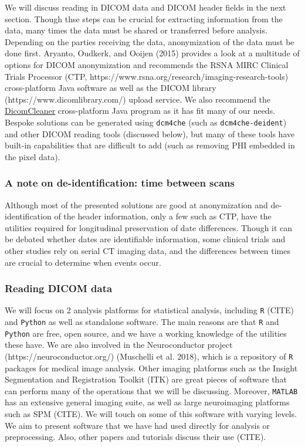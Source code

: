 \documentclass[]{elsarticle} %
\begin{document}
We will discuss reading in DICOM data and DICOM header fields in the
next section. Though thse steps can be crucial for extracting
information from the data, many times the data must be shared or
transferred before analysis. Depending on the parties receiving the
data, anonymization of the data must be done first. Aryanto, Oudkerk,
and Ooijen (2015) provides a look at a multitude of options for DICOM
anonymization and recommends the RSNA MIRC Clinical Trials Processor
(CTP, https://www.rsna.org/research/imaging-research-tools)
cross-platform Java software as well as the DICOM library
(https://www.dicomlibrary.com/) upload service. We also recommend the
\href{https://www.dclunie.com/pixelmed/software/webstart/DicomCleanerUsage.html}{DicomCleaner}
cross-platform Java program as it has fit many of our needs. Bespoke
solutions can be generated using \texttt{dcm4che} (such as
\texttt{dcm4che-deident}) and other DICOM reading tools (discussed
below), but many of these tools have built-in capabilities that are
difficult to add (such as removing PHI embedded in the pixel data).

\hypertarget{a-note-on-de-identification-time-between-scans}{%
\subsubsection{A note on de-identification: time between
scans}\label{a-note-on-de-identification-time-between-scans}}

Although most of the presented solutions are good at anonymization and
de-identification of the header information, only a few such as CTP,
have the utilities required for longitudinal preservation of date
differences. Though it can be debated whether dates are identifiable
information, some clinical trials and other studies rely on serial CT
imaging data, and the differences between times are crucial to determine
when events occur.

\hypertarget{reading-dicom-data}{%
\subsubsection{Reading DICOM data}\label{reading-dicom-data}}

We will focus on 2 analysis platforms for statistical analysis,
including \texttt{R} (CITE) and \texttt{Python} as well as standalone
software. The main reasons are that \texttt{R} and \texttt{Python} are
free, open source, and we have a working knowledge of the utilities
these have. We are also involved in the Neuroconductor project
(https://neuroconductor.org/) (Muschelli et al. 2018), which is a
repository of \texttt{R} packages for medical image analysis. Other
imaging platforms such as the Insight Segmentation and Registration
Toolkit (ITK) are great pieces of software that can perform many of the
operations that we will be discussing. Moreover, \texttt{MATLAB} has an
extensive general imaging suite, as well as large neuroimaging platforms
such as SPM (CITE). We will touch on some of this software with varying
levels. We aim to present software that we have had used directly for
analysis or preprocessing. Also, other papers and tutorials discuss
their use (CITE).
\end{document}
